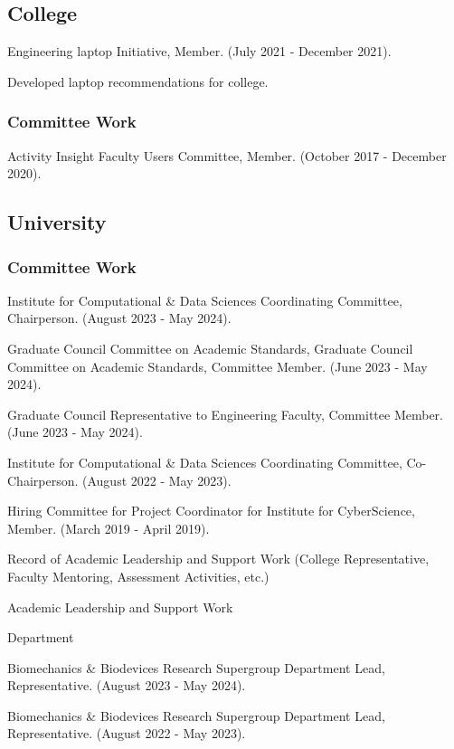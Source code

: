 \documentclass[a4paper,10pt]{article}
\begin{document}
\subsection*{College}

Engineering laptop Initiative, Member. (July 2021 - December 2021).

Developed laptop recommendations for college.

\hspace{1cm}\subsubsection*{Committee Work}

Activity Insight Faculty Users Committee, Member. (October 2017 - December 2020).

\subsection*{University}

\hspace{1cm}\subsubsection*{Committee Work}

Institute for Computational & Data Sciences Coordinating Committee, Chairperson. (August 2023 - May 2024).

Graduate Council Committee on Academic Standards, Graduate Council Committee on Academic Standards, Committee Member. (June 2023 - May 2024).

Graduate Council Representative to Engineering Faculty, Committee Member. (June 2023 - May 2024).

Institute for Computational & Data Sciences Coordinating Committee, Co-Chairperson. (August 2022 - May 2023).

Hiring Committee for Project Coordinator for Institute for CyberScience, Member. (March 2019 - April 2019).

Record of Academic Leadership and Support Work (College Representative, Faculty Mentoring, Assessment Activities, etc.)

Academic Leadership and Support Work

Department

Biomechanics & Biodevices Research Supergroup Department Lead, Representative. (August 2023 - May 2024).

Biomechanics & Biodevices Research Supergroup Department Lead, Representative. (August 2022 - May 2023).
\end{document}
